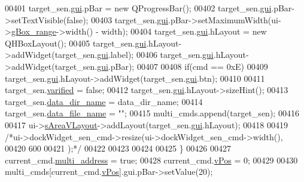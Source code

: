 \begin{DoxyCode}
00401            target\_sen.\hyperlink{a00004_a7758f566562596be39abf215046e32f0}{gui}.pBar  = \textcolor{keyword}{new} QProgressBar();
00402            target\_sen.\hyperlink{a00004_a7758f566562596be39abf215046e32f0}{gui}.pBar->setTextVisible(\textcolor{keyword}{false});
00403            target\_sen.\hyperlink{a00004_a7758f566562596be39abf215046e32f0}{gui}.pBar->setMaximumWidth(ui->\hyperlink{a00080_a3c12d0504a310784c3820d1a9ad469c2}{gBox\_range}->width() - width);
00404            target\_sen.\hyperlink{a00004_a7758f566562596be39abf215046e32f0}{gui}.hLayout = \textcolor{keyword}{new} QHBoxLayout();
00405            target\_sen.\hyperlink{a00004_a7758f566562596be39abf215046e32f0}{gui}.hLayout->addWidget(target\_sen.\hyperlink{a00004_a7758f566562596be39abf215046e32f0}{gui}.label);
00406            target\_sen.\hyperlink{a00004_a7758f566562596be39abf215046e32f0}{gui}.hLayout->addWidget(target\_sen.\hyperlink{a00004_a7758f566562596be39abf215046e32f0}{gui}.pBar);
00407 
00408           \textcolor{keywordflow}{if}(cmd == 0xE)
00409            target\_sen.\hyperlink{a00004_a7758f566562596be39abf215046e32f0}{gui}.hLayout->addWidget(target\_sen.\hyperlink{a00004_a7758f566562596be39abf215046e32f0}{gui}.btn);
00410 
00411            target\_sen.\hyperlink{a00004_a0438d70fa5f3dd26987180982ee28352}{varified} = \textcolor{keyword}{false};
00412            target\_sen.\hyperlink{a00004_a7758f566562596be39abf215046e32f0}{gui}.hLayout->sizeHint();
00413            target\_sen.\hyperlink{a00004_ab96a1a110eea887a27173c37866e876e}{data\_dir\_name} = data\_dir\_name;
00414            target\_sen.\hyperlink{a00004_a76c985468c91b36f693cbaf858297d9f}{data\_file\_name} = \textcolor{stringliteral}{""};
00415            multi\_cmds.append(target\_sen);
00416 
00417            ui->\hyperlink{a00080_a2bdce9ad313cd4ee575613f36cbc4678}{sAreaVLayout}->addLayout(target\_sen.\hyperlink{a00004_a7758f566562596be39abf215046e32f0}{gui}.hLayout);
00418 
00419            \textcolor{comment}{/*ui->dockWidget\_sen\_cmd->resize(ui->dockWidget\_sen\_cmd->width(),}
00420 \textcolor{comment}{                                        600}
00421 \textcolor{comment}{                                         );*/}
00422 
00423 
00424 
00425           \}
00426 
00427           current\_cmd.\hyperlink{a00004_a8e69b971c61ced27a7567efd2bf0db59}{multi\_address} = \textcolor{keyword}{true};
00428           current\_cmd.\hyperlink{a00004_a2b48b371fd84be2a8ad581b1ad708b88}{vPos} = 0;
00429 
00430           multi\_cmds[current\_cmd.\hyperlink{a00004_a2b48b371fd84be2a8ad581b1ad708b88}{vPos}].gui.pBar->setValue(20);

\end{DoxyCode}
